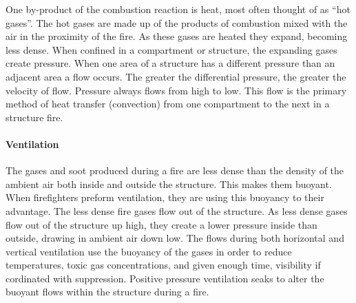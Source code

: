 \documentclass{article}
\begin{document}
One by-product of the combustion reaction is heat, most often thought of as ``hot gases''. The hot gases are made up of the products of combustion mixed with the air in the proximity of the fire. As these gases are heated they expand, becoming less dense. When confined in a compartment or structure, the expanding gases create pressure. When one area of a structure has a different pressure than an adjacent area a flow occurs. The greater the differential pressure, the greater the velocity of flow. Pressure always flows from high to low. This flow is the primary method of heat transfer (convection) from one compartment to the next in a structure fire. 

\paragraph{Ventilation} \mbox{}

The gases and soot produced during a fire are less dense than the density of the ambient air both inside and outside the structure. This makes them buoyant. When firefighters preform ventilation, they are using this buoyancy to their advantage. The less dense fire gases flow out of the structure. As less dense gases flow out of the structure up high, they create a lower pressure inside than outside, drawing in ambient air down low. The flows during both horizontal and vertical ventilation use the buoyancy of the gases in order to reduce temperatures, toxic gas concentrations, and given enough time, visibility if cordinated with suppression. Positive pressure ventilation seaks to alter the buoyant flows within the structure during a fire. 
\end{document}
